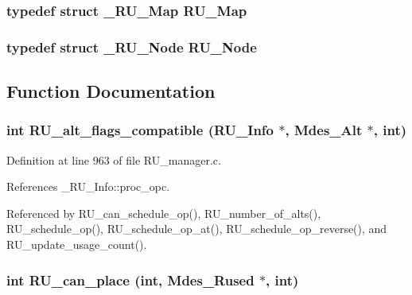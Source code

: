 \subsubsection{\setlength{\rightskip}{0pt plus 5cm}typedef struct \bf{\_\-RU\_\-Map}  \bf{RU\_\-Map}}\label{RU__manager_8h_4e4d18b14eb7053201dc51ff90477ec1}


\subsubsection{\setlength{\rightskip}{0pt plus 5cm}typedef struct \bf{\_\-RU\_\-Node}  \bf{RU\_\-Node}}\label{RU__manager_8h_15d79281e283bdb6b53b2aa50bcb377a}




\subsection{Function Documentation}
\subsubsection{\setlength{\rightskip}{0pt plus 5cm}int RU\_\-alt\_\-flags\_\-compatible (\bf{RU\_\-Info} $\ast$, Mdes\_\-Alt $\ast$, int)}\label{RU__manager_8h_ed1a4fe69a3b5ca6c8eb8186a56617d8}




Definition at line 963 of file RU\_\-manager.c.

References \_\-RU\_\-Info::proc\_\-opc.

Referenced by RU\_\-can\_\-schedule\_\-op(), RU\_\-number\_\-of\_\-alts(), RU\_\-schedule\_\-op(), RU\_\-schedule\_\-op\_\-at(), RU\_\-schedule\_\-op\_\-reverse(), and RU\_\-update\_\-usage\_\-count().
\subsubsection{\setlength{\rightskip}{0pt plus 5cm}int RU\_\-can\_\-place (int, Mdes\_\-Rused $\ast$, int)}\label{RU__manager_8h_5d59b5179dc1205ab512ddaf63e14718}




